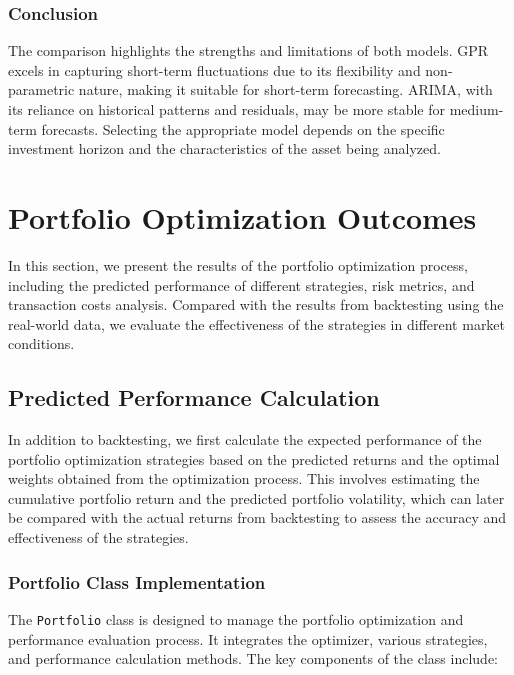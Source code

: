 \subsubsection{Conclusion}

The comparison highlights the strengths and limitations of both models. GPR excels in capturing short-term fluctuations due to its flexibility and non-parametric nature, making it suitable for short-term forecasting. ARIMA, with its reliance on historical patterns and residuals, may be more stable for medium-term forecasts. Selecting the appropriate model depends on the specific investment horizon and the characteristics of the asset being analyzed.



\section{Portfolio Optimization Outcomes}
In this section, we present the results of the portfolio optimization process, including the predicted performance of different strategies, risk metrics, and transaction costs analysis. Compared with the results from backtesting using the real-world data, we evaluate the effectiveness of the strategies in different market conditions.



\subsection{Predicted Performance Calculation}

In addition to backtesting, we first calculate the expected performance of the portfolio optimization strategies based on the predicted returns and the optimal weights obtained from the optimization process. This involves estimating the cumulative portfolio return and the predicted portfolio volatility, which can later be compared with the actual returns from backtesting to assess the accuracy and effectiveness of the strategies.

\subsubsection{Portfolio Class Implementation}

The \texttt{Portfolio} class is designed to manage the portfolio optimization and performance evaluation process. It integrates the optimizer, various strategies, and performance calculation methods. The key components of the class include:

